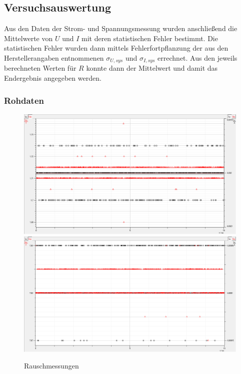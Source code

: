 \documentclass[12pt,a4paper]{article}
\begin{document}
\subsection{Versuchsauswertung}
Aus den Daten der Strom- und Spannungsmessung wurden anschließend die Mittelwerte von $U$ und $I$ mit deren statistischen Fehler bestimmt.
Die statistischen Fehler wurden dann mittels Fehlerfortpflanzung der aus den Herstellerangaben entnommenen $\sigma_{U,sys}$ und $\sigma_{I,sys}$ errechnet. 
Aus den jeweils berechneten Werten für $R$ konnte dann der Mittelwert und damit das Endergebnis angegeben werden.
\newpage
\subsubsection{Rohdaten}
\begin{figure}[H]
\includegraphics[scale=0.5]{Rauschmessung1.png}
\includegraphics[scale=0.5]{Rauschmessung2.png}  
\caption{Rauschmessungen}
\end{figure}
\newpage
\end{document}
